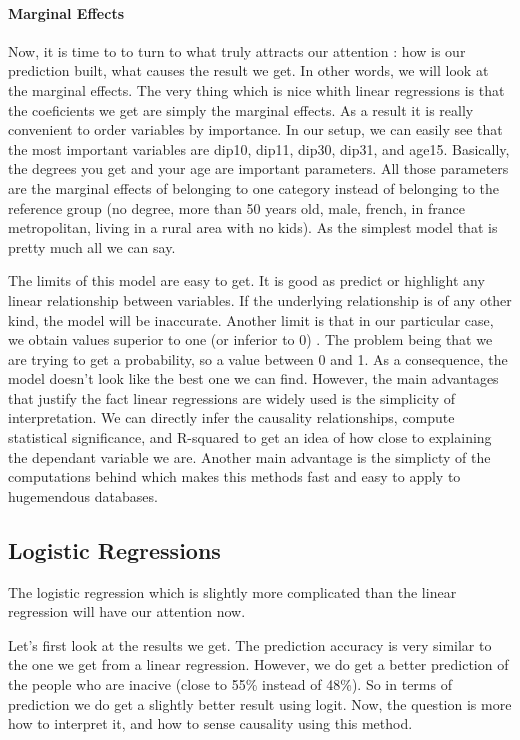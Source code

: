 \paragraph{Marginal Effects}
Now, it is time to to turn to what truly attracts our attention : how is our prediction built, what causes the result we get. In other words, we will look at the marginal effects.
The very thing which is nice whith linear regressions is that the coeficients we get are simply the marginal effects. As a result it is really convenient to order variables by importance. In our setup, we can easily see that the most important variables are dip10, dip11, dip30, dip31, and age15. Basically, the degrees you get and your age are important parameters.
All those parameters are the marginal effects of belonging to one category instead of belonging to the reference group (no degree, more than 50 years old, male, french, in france metropolitan, living in a rural area with no kids).
As the simplest model that is pretty much all we can say.

The limits of this model are easy to get. It is good as predict or highlight any linear relationship between variables. If the underlying relationship is of any other kind, the model will be inaccurate. Another limit is that in our particular case, we obtain values superior to one (or inferior to 0) . The problem being that we are trying to get a probability, so a value between 0 and 1. As a consequence, the model doesn’t look like the best one we can find.
However, the main advantages that justify the fact linear regressions are widely used is the simplicity of interpretation. We can directly infer the causality relationships, compute statistical significance, and R-squared to get an idea of how close to explaining the dependant variable we are.  Another main advantage is the simplicty of the computations behind which makes this methods fast and easy to apply to hugemendous databases.

\subsection{Logistic Regressions}
The logistic regression which is slightly more complicated than the linear regression will have our attention now.


Let’s first look at the results we get. The prediction accuracy is very similar to the one we get from a linear regression. However, we do get a better prediction of the people who are inacive (close to 55\% instead of 48\%). So in terms of prediction we do get a slightly better result using logit.
Now, the question is more how to interpret it, and how to sense causality using this method.

